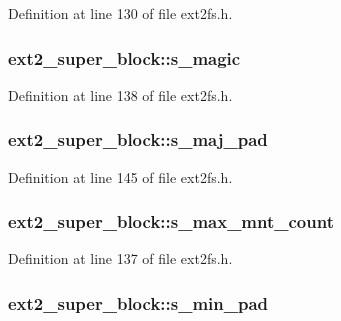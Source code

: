 \-Definition at line 130 of file ext2fs.\-h.

\hypertarget{structext2__super__block_a22b76c4f2b2547630739f5c2ebb9d4b9}{
\subsubsection[{s\-\_\-magic}]{ {\bf ext2\-\_\-super\-\_\-block\-::s\-\_\-magic}}}\label{structext2__super__block_a22b76c4f2b2547630739f5c2ebb9d4b9}


\-Definition at line 138 of file ext2fs.\-h.

\hypertarget{structext2__super__block_a0e91e778203e498adaf6fc27fa60abe2}{
\subsubsection[{s\-\_\-maj\-\_\-pad}]{ {\bf ext2\-\_\-super\-\_\-block\-::s\-\_\-maj\-\_\-pad}}}\label{structext2__super__block_a0e91e778203e498adaf6fc27fa60abe2}


\-Definition at line 145 of file ext2fs.\-h.

\hypertarget{structext2__super__block_a7823bb2004c8a837a207b71d73dc8662}{
\subsubsection[{s\-\_\-max\-\_\-mnt\-\_\-count}]{ {\bf ext2\-\_\-super\-\_\-block\-::s\-\_\-max\-\_\-mnt\-\_\-count}}}\label{structext2__super__block_a7823bb2004c8a837a207b71d73dc8662}


\-Definition at line 137 of file ext2fs.\-h.

\hypertarget{structext2__super__block_a034b6a7fcef4fa76244664c79618e255}{
\subsubsection[{s\-\_\-min\-\_\-pad}]{ {\bf ext2\-\_\-super\-\_\-block\-::s\-\_\-min\-\_\-pad}}}\label{structext2__super__block_a034b6a7fcef4fa76244664c79618e255}


